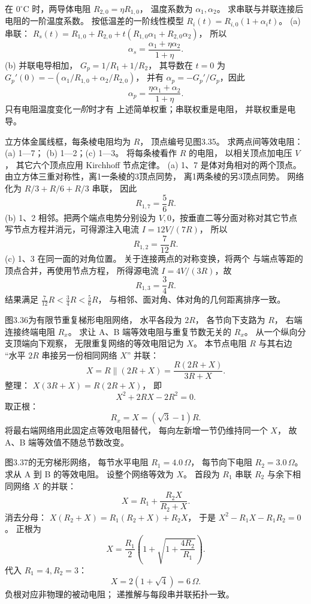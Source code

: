 在 $0^\circ\mathrm C$ 时，两导体电阻
$R_{2,0}=\eta R_{1,0}$，
温度系数为 $\alpha_1,\alpha_2$。
求串联与并联连接后电阻的一阶温度系数。
\exsolution
按低温差的一阶线性模型
$R_i(t)=R_{i,0}(1+\alpha_i t)$。
(a) 串联：
$R_s(t)=R_{1,0}+R_{2,0}
+t(R_{1,0}\alpha_1+R_{2,0}\alpha_2)$，
所以
\[
\boxed{\alpha_s=
\frac{\alpha_1+\eta\alpha_2}{1+\eta}}.
\]
(b) 并联电导相加，
$G_p=1/R_1+1/R_2$，
其导数在 $t=0$ 为
$G_p'(0)=-(\alpha_1/R_{1,0}
+\alpha_2/R_{2,0})$，
并有
$\alpha_p=-G_p'/G_p$，因此
\[
\boxed{\alpha_p=
\frac{\eta\alpha_1+\alpha_2}{1+\eta}}.
\]
\excheck 只有电阻温度变化\emph{一阶}时才有
上述简单权重；串联权重是电阻，
并联权重是电导。

立方体金属线框，每条棱电阻均为 $R$，
顶点编号见图3.35。
求两点间等效电阻：(a) 1—7；
(b) 1—2；(c) 1—3。
\exsolution
将每条棱看作 $R$ 的电阻，
以相关顶点加电压 $V$，
其它六个顶点应用 Kirchhoff 节点定律。
(a) 1、7 是体对角相对的两个顶点。
由立方体三重对称性，离1一条棱的3顶点同势，
离1两条棱的另3顶点同势。
网络化为
$R/3+R/6+R/3$ 串联，
因此
\[
\boxed{R_{1,7}=\frac56R}.
\]
(b) 1、2 相邻。把两个端点电势分别设为
$V,0$，按垂直二等分面对称对其它节点
写节点方程并消元，可得源注入电流
$I=12V/(7R)$，
所以
\[
\boxed{R_{1,2}=\frac7{12}R}.
\]
(c) 1、3 在同一面的对角位置。
关于连接两点的对称变换，将两个
与端点等距的顶点合并，再使用节点方程，
所得源电流 $I=4V/(3R)$，故
\[
\boxed{R_{1,3}=\frac34R}.
\]
\excheck 结果满足
$\frac7{12}R<\frac34R<\frac56R$，
与相邻、面对角、体对角的几何距离排序一致。

图3.36为有限节重复梯形电阻网络，
水平各段为 $2R$，
各节向下支路为 $R$，
右端连接终端电阻 $R_x$。
求让 A、B 端等效电阻与重复节数无关的 $R_x$。
\exsolution
从一个纵向分支顶端向下观察，
无限重复网络的等效电阻记为 $X$。
本节点电阻 $R$ 与其右边
“水平 $2R$ 串接另一份相同网络 $X$”
并联：
\[
X=R\parallel(2R+X)
=\frac{R(2R+X)}{3R+X}.
\]
整理：
$X(3R+X)=R(2R+X)$，
即
\[
X^2+2RX-2R^2=0.
\]
取正根：
\[
\boxed{R_x=X=(\sqrt3-1)R}.
\]
\excheck 将最右端网络用此固定点等效电阻替代，
每向左新增一节仍维持同一个 $X$，
故 A、B 端等效值不随总节数改变。

图3.37的无穷梯形网络，
每节水平电阻
$R_1=4.0\,\Omega$，
每节向下电阻
$R_2=3.0\,\Omega$。
求从 A 到 B 的等效电阻。
\exsolution
设整个网络等效为 $X$。
首段为 $R_1$ 串联
$R_2$ 与余下相同网络 $X$ 的并联：
\[
X=R_1+\frac{R_2X}{R_2+X}.
\]
消去分母：
$X(R_2+X)=R_1(R_2+X)+R_2X$，
于是
$X^2-R_1X-R_1R_2=0$。
正根为
\[
\boxed{X=\frac{R_1}{2}
\left(1+\sqrt{1+\frac{4R_2}{R_1}}\right)}.
\]
代入 $R_1=4,R_2=3$：
\[
\boxed{X=2(1+\sqrt4)=6\,\Omega}.
\]
\excheck 负根对应非物理的被动电阻；
递推解与每段串并联拓扑一致。

